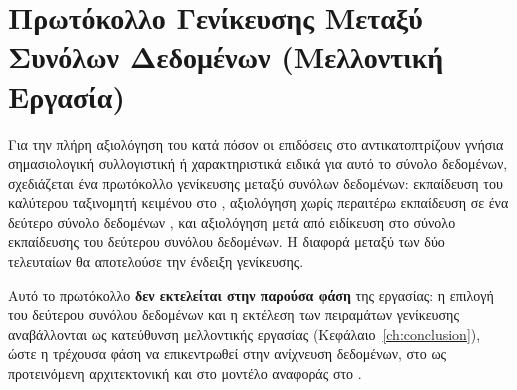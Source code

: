 \section{Πρωτόκολλο Γενίκευσης Μεταξύ Συνόλων Δεδομένων (Μελλοντική Εργασία)}
\label{sec:generalization-protocol}

Για την πλήρη αξιολόγηση του κατά πόσον οι επιδόσεις στο 
αντικατοπτρίζουν γνήσια σημασιολογική συλλογιστική ή χαρακτηριστικά ειδικά για
αυτό το σύνολο δεδομένων, σχεδιάζεται ένα πρωτόκολλο γενίκευσης μεταξύ συνόλων
δεδομένων: εκπαίδευση του καλύτερου ταξινομητή κειμένου στο ,
αξιολόγηση χωρίς περαιτέρω εκπαίδευση σε ένα δεύτερο σύνολο δεδομένων , και
αξιολόγηση μετά από ειδίκευση στο σύνολο εκπαίδευσης του δεύτερου συνόλου
δεδομένων.
Η διαφορά μεταξύ των δύο τελευταίων θα αποτελούσε την ένδειξη
γενίκευσης.

Αυτό το πρωτόκολλο \textbf{δεν εκτελείται στην παρούσα φάση} της εργασίας: η
επιλογή του δεύτερου συνόλου δεδομένων και η εκτέλεση των πειραμάτων γενίκευσης
αναβάλλονται ως κατεύθυνση μελλοντικής εργασίας (Κεφάλαιο~\ref{ch:conclusion}),
ώστε η τρέχουσα φάση να επικεντρωθεί στην ανίχνευση δεδομένων, στο 
ως προτεινόμενη αρχιτεκτονική και στο μοντέλο αναφοράς  στο .
